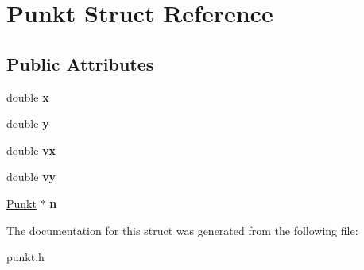 \hypertarget{struct_punkt}{}\section{Punkt Struct Reference}
\label{struct_punkt}
\subsection*{Public Attributes}
\begin{DoxyCompactItemize}
\item 
\mbox{\label{struct_punkt_ac01c5fc6681b8faa6cd21060c6b5542c}} 
double {\bfseries x}
\item 
\mbox{\label{struct_punkt_a1b4dbf2d3c789e8eadea2303186ad1b3}} 
double {\bfseries y}
\item 
\mbox{\label{struct_punkt_adc67078d54e8b0d7dec8fce72806aae9}} 
double {\bfseries vx}
\item 
\mbox{\label{struct_punkt_a16c4ac61238ed40abf8d70352cd4fd7e}} 
double {\bfseries vy}
\item 
\mbox{\label{struct_punkt_a8eb1e41a59307a243563e158259c911a}} 
\mbox{\hyperlink{struct_punkt}{Punkt}} $\ast$ {\bfseries n}
\end{DoxyCompactItemize}


The documentation for this struct was generated from the following file\+:\begin{DoxyCompactItemize}
\item 
punkt.\+h\end{DoxyCompactItemize}
